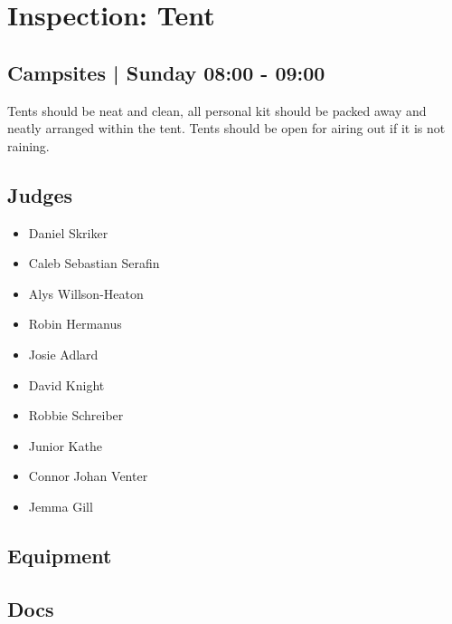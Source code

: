 \documentclass[10pt]{article}
\begin{document}
		\begin{minipage}{\linewidth}
		\setcounter{section}{29}
	\section{Inspection: Tent }
	\subsection*{Campsites | Sunday 08:00 - 09:00}

	Tents should be neat and clean, all personal kit should be packed away and neatly arranged within the tent. Tents should be open for airing out if it is not raining. 

	\begin{multicols}{2}
	\subsection*{\faUsers \: Judges}
	\begin{itemize}
			\item Daniel Skriker
			\item Caleb Sebastian Serafin
			\item Alys Willson-Heaton
			\item Robin Hermanus
			\item Josie Adlard
			\item David Knight
			\item Robbie Schreiber
			\item Junior Kathe
			\item Connor Johan Venter
			\item Jemma Gill
		\end{itemize}
	\columnbreak
	\subsection*{\faWrench \: Equipment}
	        \vfill\null
        \subsection*{\faFile \: Docs}
     	\end{multicols}


	\vspace{1cm}
	\end{minipage}
\end{document}
